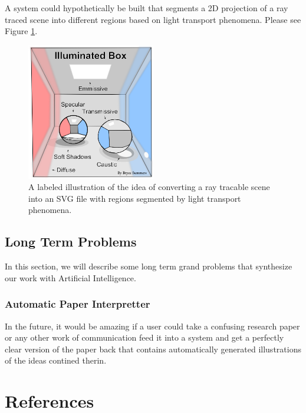 \documentclass[12pt, letterpaper]{article}
\begin{document}
		A system could hypothetically be built that segments a 2D projection of a ray traced scene into different regions based on light transport phenomena.
		Please see Figure \ref{fig:cornell_box_illustration}.

		\begin{figure}[h]
		\centering
		\includegraphics[width=0.5\textwidth]{cornell_box_illustration}
		\caption{A labeled illustration of the idea of converting a ray tracable scene into an SVG file with regions segmented by light transport phenomena.}
		\label{fig:cornell_box_illustration}
		\end{figure}


	\subsection{Long Term Problems}

		In this section, we will describe some long term grand problems that synthesize our work with Artificial Intelligence.

		\subsubsection{Automatic Paper Interpretter}
		In the future, it would be amazing if a user could take a confusing research paper or any other work of communication feed it into a system and get a perfectly clear version of the paper back
		that contains automatically generated illustrations of the ideas contined therin.

\newpage

\section{References}
\end{document}
